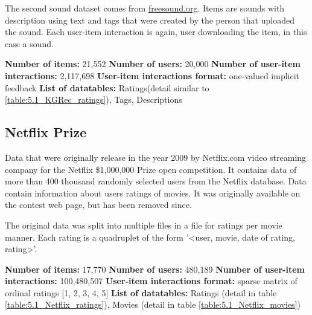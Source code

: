 The second sound dataset comes from \href{https://freesound.org/}{freesound.org}. Items are sounds with description using text and tags that were created by the person that uploaded the sound. Each user-item interaction is again, user downloading the item, in this case a sound.

\hfill \break
\noindent
\textbf{Number of items:} 21,552 \newline
\textbf{Number of users:} 20,000 \newline
\textbf{Number of user-item interactions:} 2,117,698 \newline
\textbf{User-item interactions format:} one-valued implicit feedback \newline
\textbf{List of datatables:} Ratings(detail similar to \ref{table:5.1_KGRec_ratings}), Tags, Descriptions




\subsection{Netflix Prize}

Data that were originally release in the year 2009 by Netflix.com video streaming company for the Netflix \$1,000,000 Prize open competition. It contains data of more than 400 thousand randomly selected users from the Netflix database. Data contain information about users ratings of movies. It was originally available on the contest web page, but has been removed since.

The original data was split into multiple files in a file for ratings per movie manner. Each rating is a quadruplet of the form '<user, movie, date of rating, rating>'.

\hfill \break
\noindent
\textbf{Number of items:} 17,770 \newline
\textbf{Number of users:} 480,189 \newline
\textbf{Number of user-item interactions:} 100,480,507 \newline
\textbf{User-item interactions format:} sparse matrix of ordinal ratings [1, 2, 3, 4, 5] \newline
\textbf{List of datatables:} Ratings (detail in table \ref{table:5.1_Netflix_ratings}), Movies (detail in table \ref{table:5.1_Netflix_movies})

